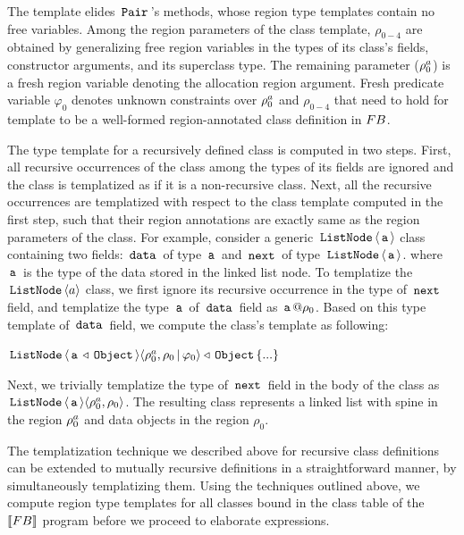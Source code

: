 The template elides $\,{\tt Pair}\,$'s methods, whose region type templates
contain no free variables. Among the region parameters of the class
template, $\rho_{0-4}$ are obtained by generalizing free region
variables in the types of its class's fields, constructor arguments,
and its superclass type.  The remaining parameter ($\rho^a_0$) is a
fresh region variable denoting the allocation region argument. Fresh
predicate variable $\varphi_0$ denotes unknown constraints over
$\rho^a_0$ and $\rho_{0-4}$ that need to hold for template to be a
well-formed region-annotated class definition in ${\sc FB}$. 

The type template for a recursively defined class is computed in two
steps. First, all recursive occurrences of the class among the types of
its fields are ignored and the class is templatized as if it is a
non-recursive class. Next, all the recursive occurrences are
templatized with respect to the class template computed in the first
step, such that their region annotations are exactly same as the
region parameters of the class. For example, consider a generic
$\,{\tt ListNode}\,\langle \,{\tt a}\, \rangle$ class containing two fields: $\,{\tt data}\,$ of
type $\,{\tt a}\,$ and $\,{\tt next}\,$ of type $\,{\tt ListNode}\,\langle \,{\tt a}\, \rangle$.
where $\,{\tt a}\,$ is the type of the data stored in the linked list node.
To templatize the $\,{\tt ListNode}\,\langle a \rangle$ class, we first ignore its
recursive occurrence in the type of $\,{\tt next}\,$ field, and templatize
the type $\,{\tt a}\,$ of $\,{\tt data}\,$ field as $\,{\tt a}\,@\rho_0$. Based on this
type template of $\,{\tt data}\,$ field, we compute the class's template as
following:
\begin{center}
$\,{\tt ListNode}\,\langle \,{\tt a}\,\triangleleft\,{\tt Object}\, \rangle
\langle \rho^a_0,\rho_0\,|\,\varphi_0 \rangle \triangleleft \,{\tt Object}\, \{...\}$
\end{center}
Next, we trivially templatize the type of $\,{\tt next}\,$ field in the body
of the class as $\,{\tt ListNode}\,\langle \,{\tt a}\, \rangle\langle \rho^a_0,\rho_0 \rangle$.
The resulting class represents a linked list with spine in the region
$\rho^a_0$ and data objects in the region $\rho_0$.

The templatization technique we described above for recursive class
definitions can be extended to mutually recursive definitions in a
straightforward manner, by simultaneously templatizing them. Using the
techniques outlined above, we compute region type templates for all
classes bound in the class table of the $\llbracket {\sc FB} \rrbracket$ program before
we proceed to elaborate expressions.

